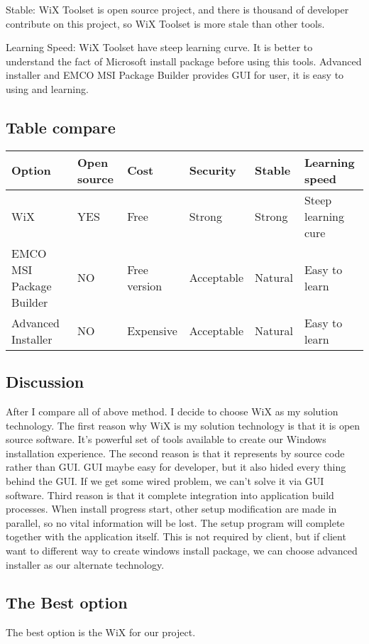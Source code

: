 Stable: WiX Toolset is open source project, and there is thousand of developer contribute on this project, so WiX Toolset is more stale than other tools.

Learning Speed: WiX Toolset have steep learning curve. It is better to understand the fact of Microsoft install package before using this tools. Advanced installer and EMCO MSI Package Builder provides GUI for user, it is easy to using and learning.

\subsection{Table compare}

\begin{center}
  \begin{tabular}{ | l | l | l | l | l | p{5cm} |}
  \hline
  Option & Open source & Cost & Security & Stable & Learning speed\\ \hline
  WiX & YES & Free & Strong & Strong & Steep learning cure\\ \hline
  EMCO MSI Package Builder & NO & Free version & Acceptable & Natural & Easy to learn\\ \hline
  Advanced Installer & NO & Expensive & Acceptable & Natural & Easy to learn\\ \hline
  \end{tabular}
\end{center}

\subsection{Discussion}
After I compare all of above method. I decide to choose WiX as my solution technology. The first reason why WiX is my solution technology is that it is open source software. It's powerful set of tools available to create our Windows installation experience.
The second reason is that it represents by source code rather than GUI. GUI maybe easy for developer, but it also hided every thing behind the GUI. If we get some wired problem, we can't solve it via GUI software. 
Third reason is that it complete integration into application build processes. When install progress start, other setup modification are made in parallel, so no vital information will be lost. The setup program will complete together with the application itself. This is not required by client, but if client want to different way to create windows install package, we can choose advanced installer as our alternate technology.

\subsection{The Best option}
The best option is the WiX for our project.
